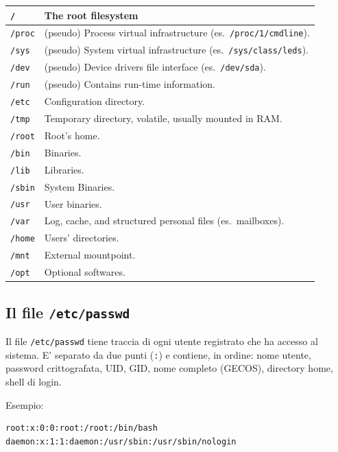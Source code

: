 \begin{center}
  \footnotesize
  \begin{tabular}{|l|p{9cm}|}
    \hline
    \texttt{/} & The root filesystem \\ \hline
    \texttt{/proc} & (pseudo) Process virtual infrastructure (es.\ \texttt{/proc/1/cmdline}). \\ \hline
    \texttt{/sys} & (pseudo) System virtual infrastructure (es.\ \texttt{/sys/class/leds}). \\ \hline
    \texttt{/dev} & (pseudo) Device drivers file interface (es.\ \texttt{/dev/sda}). \\ \hline
    \texttt{/run} & (pseudo) Contains run-time information. \\ \hline
    \texttt{/etc} & Configuration directory. \\ \hline
    \texttt{/tmp} & Temporary directory, volatile, usually mounted in RAM. \\ \hline
    \texttt{/root} & Root's home. \\ \hline
    \texttt{/bin} & Binaries. \\ \hline
    \texttt{/lib} & Libraries. \\ \hline
    \texttt{/sbin} & System Binaries. \\ \hline
    \texttt{/usr} & User binaries. \\ \hline
    \texttt{/var} & Log, cache, and structured personal files (es.\ mailboxes). \\ \hline
    \texttt{/home} & Users' directories. \\ \hline
    \texttt{/mnt} & External mountpoint. \\ \hline
    \texttt{/opt} & Optional softwares. \\ \hline
  \end{tabular}
\end{center}

\subsection{Il file \texttt{/etc/passwd}}
Il file \texttt{/etc/passwd} tiene traccia di ogni utente registrato che ha accesso al sistema. E' separato da due punti (\texttt{:}) e contiene, in ordine: nome utente, password crittografata, UID, GID, nome completo (GECOS), directory home, shell di login.

Esempio:
\begin{verbatim}
root:x:0:0:root:/root:/bin/bash
daemon:x:1:1:daemon:/usr/sbin:/usr/sbin/nologin
\end{verbatim}

